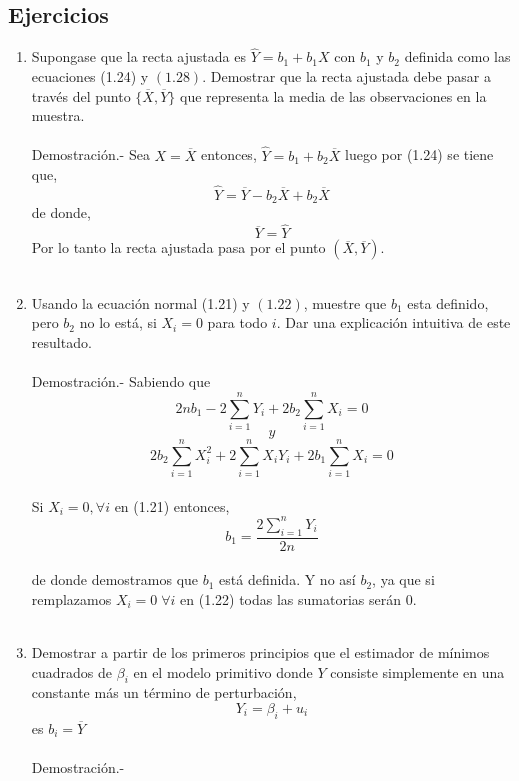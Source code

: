 \begin{multicols}{2}
\section{Ejercicios}
\begin{enumerate}[\bfseries 1.1]

    \item Supongase que la recta ajustada es $\hat{Y}=b_1+b_1X$ con $b_1$ y $b_2$ definida como las ecuaciones (1.24) y $(1.28)$. Demostrar que la recta ajustada debe pasar a través del punto $\lbrace\overline{X},\overline{Y}\rbrace$ que representa la media de las observaciones en la muestra.\\\\
	Demostración.-\; Sea $X=\overline{X}$ entonces, $\hat{Y} = b_1 + b_2\overline{X}$ luego por (1.24) se tiene que,
	$$\hat{Y} = \overline{Y} - b_2\overline{X} + b_2\overline{X}$$
	de donde,
	$$\overline{Y} = \hat{Y}$$
	Por lo tanto la recta ajustada pasa por el punto $(\overline{X},\overline{Y})$.\\\\

    \item Usando la ecuación normal (1.21) y $(1.22)$, muestre que $b_1$ esta definido, pero $b_2$ no lo está, si $X_i = 0$ para todo $i$. Dar una explicación intuitiva de este resultado.\\\\
	Demostración.-\; Sabiendo que 
	$$2nb_1 - 2\sum\limits_{i=1}^n Y_i + 2b_2\sum\limits_{i=1}^n X_i = 0$$
	$$y$$
	$$2b_2\sum\limits_{i=1}^n X_i^2 + 2\sum\limits_{i=1}^n X_iY_i + 2b_1\sum\limits_{i=1}^n X_i = 0$$\\
	Si $X_i = 0, \forall i$  en (1.21) entonces,\\
	$$b_1 = \dfrac{2\sum\limits_{i=1}^n Y_i}{2n}$$\\
	de donde demostramos que $b_1$ está definida. Y no así $b_2$, ya que si remplazamos $X_i=0\; \forall i$ en (1.22) todas las sumatorias serán $0$.\\\\

    \item Demostrar a partir de los primeros principios que el estimador de mínimos cuadrados de $\beta_i$ en el modelo primitivo donde $Y$ consiste simplemente en una constante más un término de perturbación,
	$$Y_i = \beta_i + u_i$$
	es $b_i = \overline{Y}$\\\\
	Demostración.-\; 
 

\end{enumerate}

\end{multicols}
